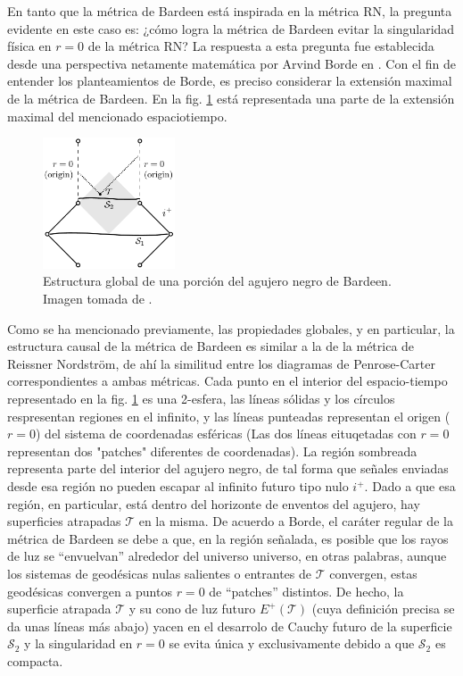 \documentclass[16pt,a4paper]{article}
\numberwithin{equation}{section}
\theoremstyle{definition}
\begin{document}
En tanto que la métrica de Bardeen está inspirada en la métrica RN, la pregunta evidente en este caso es: ¿cómo logra la métrica de Bardeen evitar la singularidad física en $r = 0$ de la métrica RN? La respuesta a esta pregunta fue establecida desde una perspectiva netamente matemática por Arvind Borde en \cite{borde1994,borde1996}. Con el fin de entender los planteamientos de Borde, es preciso considerar la extensión maximal de la métrica de Bardeen. En la fig. \ref{fig: bardeen diagram} está representada una parte de la extensión maximal del mencionado espaciotiempo.\\
\begin{figure}[h!]
	\centering
	\includegraphics[width=0.35\textwidth]{bardeenDiagram}
	\caption{Estructura global de una porción del agujero negro de Bardeen. Imagen tomada de \cite{borde1994}.}
	\label{fig: bardeen diagram}
\end{figure}

Como se ha mencionado previamente, las propiedades globales, y en particular, la estructura causal de la métrica de Bardeen es similar a la de la métrica de Reissner Nordström, de ahí la similitud entre los diagramas de Penrose-Carter correspondientes a ambas métricas. Cada punto en el interior del espacio-tiempo representado en la fig. \ref{fig: bardeen diagram} es una 2-esfera, las líneas sólidas y los círculos respresentan regiones en el infinito, y las líneas punteadas representan el origen ($r = 0$) del sistema de coordenadas esféricas (Las dos líneas eituqetadas con $r = 0$ representan dos "patches" diferentes de coordenadas). La región sombreada representa parte del interior del agujero negro, de tal forma que señales enviadas desde esa región no pueden escapar al infinito futuro tipo nulo $i^{+}$. Dado a que esa región, en particular, está dentro del horizonte de enventos del agujero, hay superficies atrapadas $\mathcal{T}$ en la misma. De acuerdo a Borde, el caráter regular de la métrica de Bardeen se debe a que, en la región señalada, es posible que los rayos de luz se ``envuelvan'' alrededor del universo universo, en otras palabras, aunque los sistemas de geodésicas nulas salientes o entrantes de $\mathcal{T}$ convergen, estas geodésicas convergen a puntos $r = 0$ de ``patches'' distintos. De hecho, la superficie atrapada $\mathcal{T}$ y su cono de luz futuro $E^{+}(\mathcal{T})$ (cuya definición precisa se da unas líneas más abajo) yacen en el desarrolo de Cauchy futuro de la superficie $\mathcal{S}_{2}$ y la singularidad en $r = 0$ se evita única y exclusivamente debido a que $\mathcal{S}_{2}$ es compacta.\\
\end{document}
